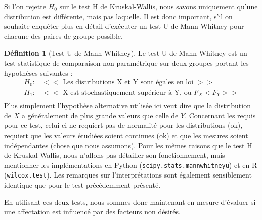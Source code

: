 \documentclass{rapport}
\theoremstyle{definition}
\newtheorem{definition}{Définition}
\theoremstyle{remark}
\theoremstyle{definition}
\theoremstyle{remark}
\begin{document}
Si l'on rejette $H_0$ sur le test H de Kruskal-Wallis, nous savons uniquement qu'une distribution est différente, mais pas laquelle. Il est donc important, s'il on souhaite enquêter plus en détail d'exécuter un test U de Mann-Whitney pour chacune des paires de groupe possible.
\begin{definition}[Test U de Mann-Whitney]
    Le test U de Mann-Whitney est un test statistique de comparaison non paramétrique sur deux groupes portant les hypothèses suivantes :
    $$
    \begin{matrix}
        H_0 : & << \text{ Les distributions X et Y sont égales en loi } >>\\
        H_1 : & << \text{ X est stochastiquement supérieur à Y, ou } F_X<F_Y >>\\
    \end{matrix}
    $$
    Plus simplement l'hypothèse alternative utilisée ici veut dire que la distribution de $X$ a généralement de plus grande valeurs que celle de $Y$.
    Concernant les requis pour ce test, celui-ci ne requiert pas de normalité pour les distributions (ok), requiert que les valeurs étudiées soient continues (ok) et que les mesures soient indépendantes (chose que nous assumons).
    Pour les mêmes raisons que le test H de Kruskal-Wallis, nous n'allons pas détailler son fonctionnement, mais mentionner les implémentations en Python (\texttt{scipy.stats.mannwhitneyu}) et en R (\texttt{wilcox.test}).
    Les remarques sur l'interprétations sont également sensiblement identique que pour le test précédemment présenté.
\end{definition}

En utilisant ces deux tests, nous sommes donc maintenant en mesure d'évaluer si une affectation est influencé par des facteurs non désirés.



\end{document}
